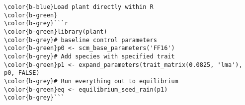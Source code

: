 \documentclass[class=minimal,border=0]{standalone}
\begin{document}
%
\begin{BVerbatim}
\color{b-blue}Load plant directly within R
\color{b-green}
\color{b-grey}```r
\color{b-green}library(plant)
\color{b-grey}# baseline control parameters
\color{b-green}p0 <- scm_base_parameters('FF16')
\color{b-grey}# Add species with specified trait
\color{b-green}p1 <- expand_parameters(trait_matrix(0.0825, 'lma'), p0, FALSE)
\color{b-grey}# Run everything out to equilibrium
\color{b-green}eq <- equilibrium_seed_rain(p1)
\color{b-grey}```
\end{BVerbatim}
\end{document}
